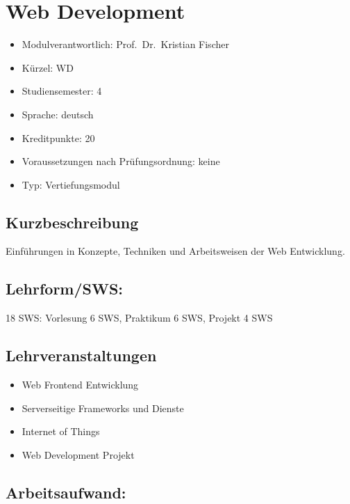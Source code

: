 \chapter{Web Development}\label{web-development}

\begin{itemize}
\tightlist
\item
  Modulverantwortlich: Prof.~Dr.~Kristian Fischer
\item
  Kürzel: WD
\item
  Studiensemester: 4
\item
  Sprache: deutsch
\item
  Kreditpunkte: 20
\item
  Voraussetzungen nach Prüfungsordnung: keine
\item
  Typ: Vertiefungsmodul
\end{itemize}

\section*{Kurzbeschreibung}\label{kurzbeschreibung-5}

Einführungen in Konzepte, Techniken und Arbeitsweisen der Web
Entwicklung.

\section*{Lehrform/SWS:}\label{lehrformsws-26}

18 SWS: Vorlesung 6 SWS, Praktikum 6 SWS, Projekt 4 SWS

\section*{Lehrveranstaltungen}\label{lehrveranstaltungen-1}

\begin{itemize}
\tightlist
\item
  Web Frontend Entwicklung
\item
  Serverseitige Frameworks und Dienste
\item
  Internet of Things
\item
  Web Development Projekt
\end{itemize}

\section*{Arbeitsaufwand:}\label{arbeitsaufwand-25}

